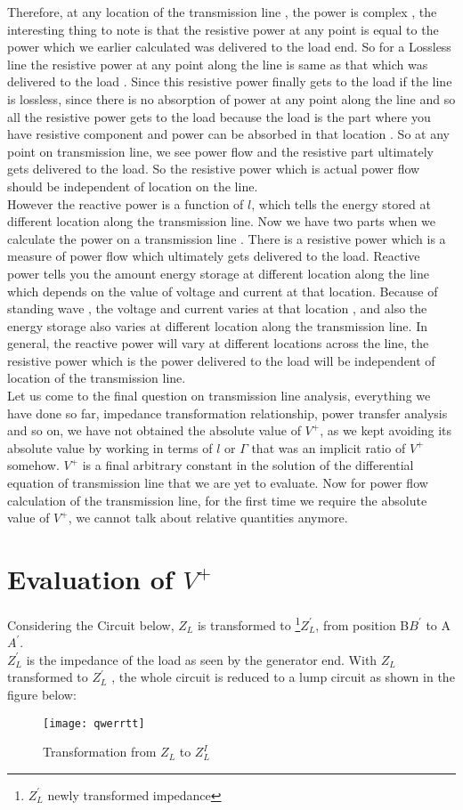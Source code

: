    Therefore, at any location of the transmission line , the power is complex , the interesting thing to note is that the resistive power at any point is equal to the power which we earlier calculated was delivered to the load end. So for a Lossless line the resistive power at any point along the line is same as that which was delivered to the load . Since  this resistive power finally gets to the load if the line is lossless, since there is no absorption of power at any point along the line and so all the resistive power gets to the load because the load is the part where you have resistive component and power can be  absorbed in that location . So at any point on transmission line, we see power flow and the resistive part ultimately gets delivered to the load.  So the resistive power which is actual power flow should be independent of location on the line.\\
   	However the reactive power is a function of $l$, which tells the energy stored at different location along the transmission line. Now we have two parts when we calculate the power on a transmission line . There is a resistive power which is a measure of power flow which ultimately gets delivered to the load. Reactive power tells you the amount energy storage at different location along the line which depends on the value of voltage and current at that location. Because of standing wave , the voltage and current varies at that location , and also the energy storage also varies at different location along the transmission line. In general, the reactive power will vary at different locations across the line, the resistive power which is the power delivered to the load will be independent of location of the transmission line.\\
   Let us come to the final question on transmission line analysis, everything we have done so far, impedance transformation relationship, power transfer analysis and so on, we have not obtained the absolute value of $V^+$, as we kept avoiding its absolute value by working in terms of $l$ or $\Gamma$ that was an implicit ratio of $V^+$ somehow. $V^+$ is a final arbitrary constant in the solution of the differential equation of
   transmission line that we are yet to evaluate. Now for power flow calculation of the transmission line, for the first time we require the absolute value of $V^+$, we cannot talk about relative quantities anymore.
    \section{Evaluation of \textbf{$ V ^ {+} $} } 
    Considering the Circuit below, $Z_L$ is transformed to \footnote{$Z^{'}_L$ newly transformed impedance}$Z^{'}_L$, from position B$B^{'}$ to A$A^{'}$.\\
    $Z^{'}_L$ is the impedance of the load as seen by the generator end. With $Z_L$ transformed to $Z^{'}_L$ , the whole circuit is reduced to a lump circuit as shown in the figure below:\\
   \begin{figure}[h]
   	\centering
   	\texttt{[image: qwerrtt]}
   	\caption{Transformation from $Z_L$ to $Z_{L}^I$}
   	\label{fig:qwerrtt}
   \end{figure}
   
